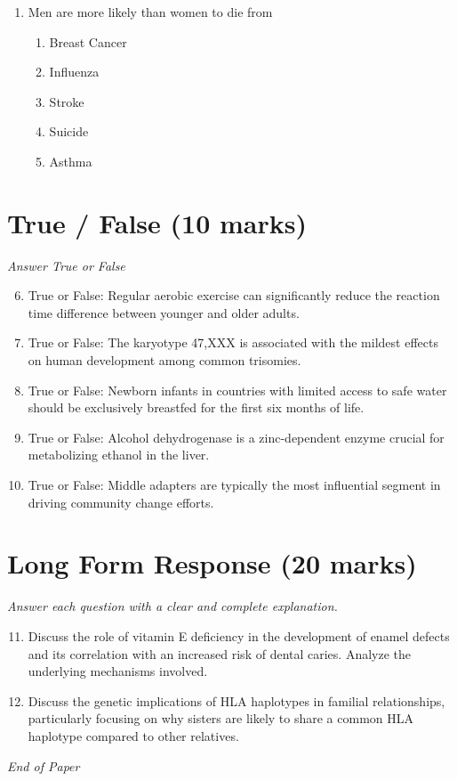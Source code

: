 \documentclass[12pt]{article}
\begin{document}
\begin{enumerate}[label=\arabic*.]
\begin{enumerate}[label=(\alph*)]
    \item Dependent on the individual's stress levels
    \item Randomly determined at birth
    \item Dependent on the individual's gender
    \item Dependent on the individual's diet and exercise
\end{enumerate}
\item Men are more likely than women to die from
\begin{enumerate}[label=(\alph*)]
    \item Breast Cancer
    \item Influenza
    \item Stroke
    \item Suicide
    \item Asthma
\end{enumerate}
\end{enumerate}

\section*{True / False (10 marks)}
\textit{Answer True or False}
\begin{enumerate}[label=\arabic*.]
\setcounter{enumi}{5}
\item True or False: Regular aerobic exercise can significantly reduce the reaction time difference between younger and older adults.
\item True or False: The karyotype 47,XXX is associated with the mildest effects on human development among common trisomies.
\item True or False: Newborn infants in countries with limited access to safe water should be exclusively breastfed for the first six months of life.
\item True or False: Alcohol dehydrogenase is a zinc-dependent enzyme crucial for metabolizing ethanol in the liver.
\item True or False: Middle adapters are typically the most influential segment in driving community change efforts.
\end{enumerate}

\section*{Long Form Response (20 marks)}
\textit{Answer each question with a clear and complete explanation.}
\begin{enumerate}[label=\arabic*.]
\setcounter{enumi}{10}
\item Discuss the role of vitamin E deficiency in the development of enamel defects and its correlation with an increased risk of dental caries. Analyze the underlying mechanisms involved.
\item Discuss the genetic implications of HLA haplotypes in familial relationships, particularly focusing on why sisters are likely to share a common HLA haplotype compared to other relatives.
\end{enumerate}

\vfill
\noindent\textit{End of Paper}
\end{document}

